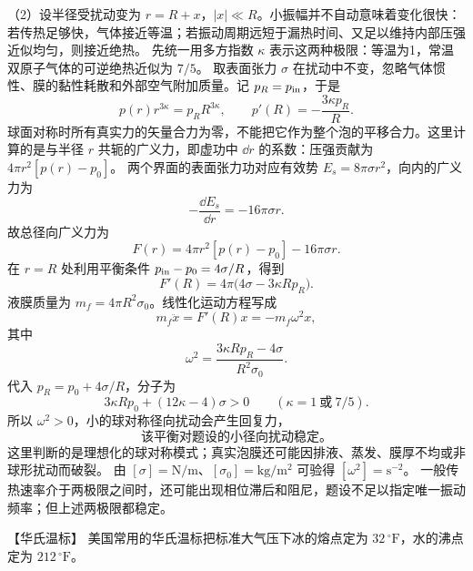 {\begin{xesolution}
（2）设半径受扰动变为 $r=R+x$，$|x|\ll R$。小振幅并不自动意味着变化很快：
若传热足够快，气体接近等温；若振动周期远短于漏热时间、又足以维持内部压强近似均匀，则接近绝热。
先统一用多方指数 $\kappa$ 表示这两种极限：等温为1，常温双原子气体的可逆绝热近似为 $7/5$。
取表面张力 $\sigma$ 在扰动中不变，忽略气体惯性、膜的黏性耗散和外部空气附加质量。记 $p_R=p_{\rm in}$，于是
\begin{equation*}
  p(r)r^{3\kappa}=p_R R^{3\kappa},
  \qquad
  p'(R)=-\frac{3\kappa p_R}{R}.
\end{equation*}
球面对称时所有真实力的矢量合力为零，不能把它作为整个泡的平移合力。这里计算的是与半径 $r$
共轭的广义力，即虚功中 $\dd r$ 的系数：压强贡献为 $4\pi r^2[p(r)-p_0]$。
两个界面的表面张力功对应有效势 $E_s=8\pi\sigma r^2$，向内的广义力为
\begin{equation*}
  -\frac{\dd E_s}{\dd r}=-16\pi\sigma r.
\end{equation*}
故总径向广义力为
\begin{equation*}
  F(r)=4\pi r^2[p(r)-p_0]-16\pi\sigma r.
\end{equation*}
在 $r=R$ 处利用平衡条件 $p_{\rm in}-p_0=4\sigma/R$，得到
\begin{equation*}
  F'(R)=4\pi\bigl(4\sigma-3\kappa Rp_R\bigr).
\end{equation*}
液膜质量为 $m_f=4\pi R^2\sigma_0$。线性化运动方程写成
\begin{equation*}
  m_f\ddot x=F'(R)x=-m_f\omega^2x,
\end{equation*}
其中
\begin{equation}
  \boxed{\omega^2=
  \frac{3\kappa Rp_R-4\sigma}{R^2\sigma_0}}.
\end{equation}
代入 $p_R=p_0+4\sigma/R$，分子为
\begin{equation*}
  3\kappa Rp_0+(12\kappa-4)\sigma>0\qquad(\kappa=1\ \text{或}\ 7/5).
\end{equation*}
所以 $\omega^2>0$，小的球对称径向扰动会产生回复力，
\begin{equation*}
  \boxed{\text{该平衡对题设的小径向扰动稳定。}}
\end{equation*}
这里判断的是理想化的球对称模式；真实泡膜还可能因排液、蒸发、膜厚不均或非球形扰动而破裂。
由 $[\sigma]=\mathrm{N/m}$、$[\sigma_0]=\mathrm{kg/m^2}$ 可验得 $[\omega^2]=\mathrm{s^{-2}}$。
一般传热速率介于两极限之间时，还可能出现相位滞后和阻尼，题设不足以指定唯一振动频率；但上述两极限都稳定。
\end{xesolution}


\begin{origexamplebox}{【华氏温标】}\label{ch15:ex:s29-20-8}
美国常用的华氏温标把标准大气压下冰的熔点定为 $32\,{}^\circ\mathrm F$，水的沸点定为
$212\,{}^\circ\mathrm F$。


\end{origexamplebox}}
